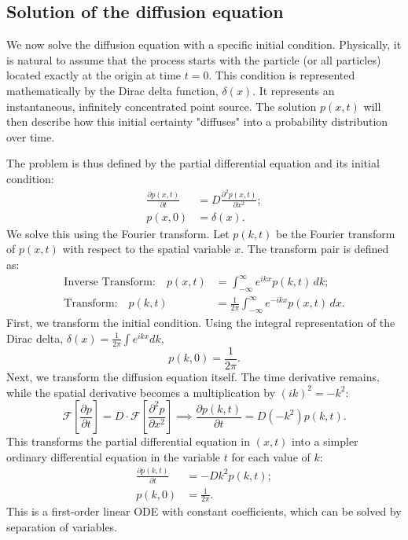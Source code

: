 \subsection{Solution of the diffusion equation}
We now solve the diffusion equation with a specific initial condition. Physically, it is natural to assume that the process starts with the particle (or all particles) located exactly at the origin at time $t=0$. This condition is represented mathematically by the Dirac delta function, $\delta(x)$. It represents an instantaneous, infinitely concentrated point source. The solution $p(x,t)$ will then describe how this initial certainty "diffuses" into a probability distribution over time.

The problem is thus defined by the partial differential equation and its initial condition:
\begin{equation}\begin{split}
    \frac{\partial p(x,t)}{\partial t} &= D \frac{\partial^2 p(x,t)}{\partial x^2}; \\
    p(x,0) &= \delta(x).
\end{split}\end{equation}
We solve this using the Fourier transform. Let $p(k,t)$ be the Fourier transform of $p(x,t)$ with respect to the spatial variable $x$. The transform pair is defined as:
\begin{equation}\begin{split}
    \text{Inverse Transform:} \quad p(x,t) &= \int_{-\infty}^{\infty} e^{ikx} p(k,t) \,dk; \\
    \text{Transform:} \quad p(k,t) &= \frac{1}{2\pi} \int_{-\infty}^{\infty} e^{-ikx} p(x,t) \,dx.
\end{split}\end{equation}
First, we transform the initial condition. Using the integral representation of the Dirac delta, $\delta(x) = \frac{1}{2\pi} \int e^{ikx} dk$,
\begin{equation}
p(k,0) = \frac{1}{2\pi}.
\end{equation}
Next, we transform the diffusion equation itself. The time derivative remains, while the spatial derivative becomes a multiplication by $(ik)^2 = -k^2$:
\begin{equation}
\mathcal{F}\left[\frac{\partial p}{\partial t}\right] = D \cdot \mathcal{F}\left[\frac{\partial^2 p}{\partial x^2}\right] \implies \frac{\partial p(k,t)}{\partial t} = D(-k^2)p(k,t).
\end{equation}
This transforms the partial differential equation in $(x,t)$ into a simpler ordinary differential equation in the variable $t$ for each value of $k$:
\begin{equation}\begin{split}
    \frac{\partial p(k,t)}{\partial t} &= -Dk^2 p(k,t); \\
    p(k,0) &= \frac{1}{2\pi}.
\end{split}\end{equation}
This is a first-order linear ODE with constant coefficients, which can be solved by separation of variables.

